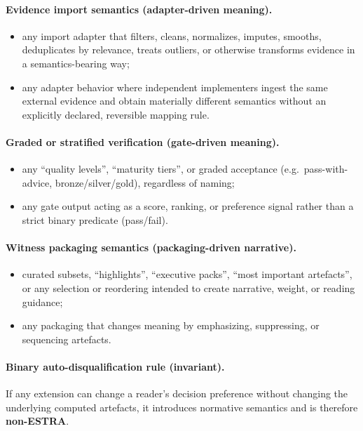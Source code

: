 \paragraph{Evidence import semantics (adapter-driven meaning).}
\begin{itemize}
  \item any import adapter
        that filters, cleans,
        normalizes, imputes,
        smooths, deduplicates
        by relevance,
        treats outliers,
        or otherwise transforms
        evidence
        in a semantics-bearing way;
  \item any adapter behavior
        where independent implementers
        ingest the same external evidence
        and obtain materially different
        semantics
        without an explicitly declared,
        reversible mapping rule.
\end{itemize}

\paragraph{Graded or stratified verification (gate-driven meaning).}
\begin{itemize}
  \item any ``quality levels'',
        ``maturity tiers'',
        or graded acceptance
        (e.g.\ pass-with-advice,
        bronze/silver/gold),
        regardless of naming;
  \item any gate output
        acting as a score,
        ranking,
        or preference signal
        rather than a strict
        binary predicate
        (pass/fail).
\end{itemize}

\paragraph{Witness packaging semantics (packaging-driven narrative).}
\begin{itemize}
  \item curated subsets,
        ``highlights'',
        ``executive packs'',
        ``most important artefacts'',
        or any selection
        or reordering
        intended to create
        narrative, weight,
        or reading guidance;
  \item any packaging
        that changes meaning
        by emphasizing,
        suppressing,
        or sequencing artefacts.
\end{itemize}

\paragraph{Binary auto-disqualification rule (invariant).}
If any extension can change
a reader's decision preference
without changing the underlying
computed artefacts,
it introduces normative semantics
and is therefore \textbf{non-ESTRA}.


